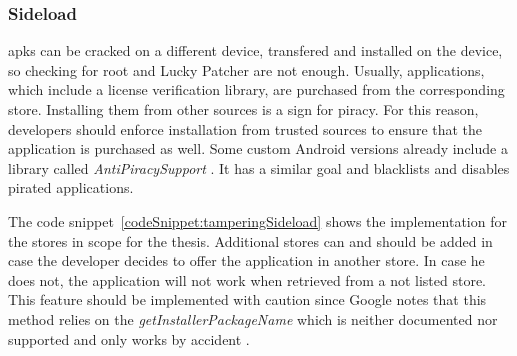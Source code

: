 \subsubsection{Sideload} \label{subsection:counter-improve-tampering-sideload}
\gls{apk}s can be cracked on a different device, transfered and installed on the device, so checking for root and Lucky Patcher are not enough.
Usually, applications, which include a license verification library, are purchased from the corresponding store.
Installing them from other sources is a sign for piracy.
For this reason, developers should enforce installation from trusted sources to ensure that the application is purchased as well.
Some custom Android versions already include a library called \textit{AntiPiracySupport} \cite{antipiracy}.
It has a similar goal and blacklists and disables pirated applications.
\newline

The code snippet~\ref{codeSnippet:tamperingSideload} shows the implementation for the stores in scope for the thesis.
Additional stores can and should be added in case the developer decides to offer the application in another store.
In case he does not, the application will not work when retrieved from a not listed store.
\newline
This feature should be implemented with caution since Google notes that this method relies on the \textit{getInstallerPackageName} which is neither documented nor supported and only works by accident \cite{developersSecuring}.
